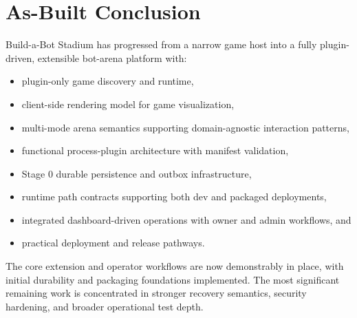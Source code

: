 \documentclass[11pt]{article}
\begin{document}
\section{As-Built Conclusion}
Build-a-Bot Stadium has progressed from a narrow game host into a fully plugin-driven, extensible bot-arena platform with:
\begin{itemize}[leftmargin=*]
  \item plugin-only game discovery and runtime,
  \item client-side rendering model for game visualization,
  \item multi-mode arena semantics supporting domain-agnostic interaction patterns,
  \item functional process-plugin architecture with manifest validation,
  \item Stage 0 durable persistence and outbox infrastructure,
  \item runtime path contracts supporting both dev and packaged deployments,
  \item integrated dashboard-driven operations with owner and admin workflows, and
  \item practical deployment and release pathways.
\end{itemize}

The core extension and operator workflows are now demonstrably in place, with initial durability and packaging foundations implemented. The most significant remaining work is concentrated in stronger recovery semantics, security hardening, and broader operational test depth.
\end{document}
